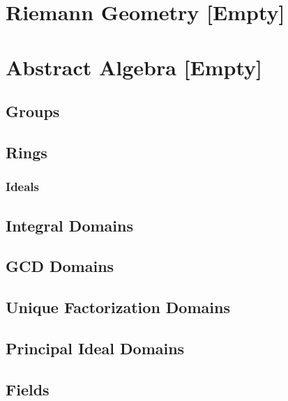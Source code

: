 \documentclass[12pt, english]{book}
\begin{document}
	
	\part{Riemann Geometry [Empty]} \label{Reimann Geometry Part}
	
	
	\part{Abstract Algebra [Empty]} \label{Abstract Algebra Part}
	
	\chapter{Groups} \label{Groups Chapter - Abstract Algebra}
	
	
	\chapter{Rings} \label{Rings Chapter - Abstract Algebra}
	
	\section{Ideals} \label{Ideals Section - Abstract Algebra}
	
	\chapter{Integral Domains} \label{Integral Domains Chapter - Abstract Algebra}
	
	\chapter{GCD Domains} \label{GCD Domains Chapter - Abstract Algebra}
	
	\chapter{Unique Factorization Domains} \label{Unique Factorization Domains Chapter - Abstract Algebra}
	
	\chapter{Principal Ideal Domains} \label{Principal Ideal Domains Chapter - Abstract Algebra}
	
	\chapter{Fields} \label{Fields Chapter - Abstract Algebra}
	
\end{document}
